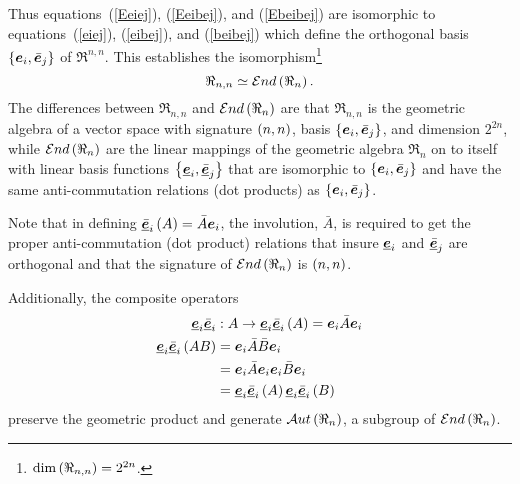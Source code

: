 Thus equations~(\ref{Eeiej}), (\ref{Eeibej}), and (\ref{Ebeibej}) are isomorphic to equations~(\ref{eiej}), (\ref{eibej}), and 
(\ref{beibej}) which define the orthogonal basis $\left \{ {\bm{e}_{i},\bar{\bm{e}}_{j}} \right \}$ of $\Re^{n,n}$.  This establishes the isomorphism\footnote{
${\dim}\left ( {\Re_{n,n}} \right )=2^{2n}$.}
\begin{equation}
	\Re_{n,n} \simeq {\mathcal{E}nd}\left ( {\Re_{n}} \right ).
\end{equation}
The differences between $\Re_{n,n}$ and ${\mathcal{E}nd}\left ( {\Re_{n}} \right )$ are that $\Re_{n,n}$ is the geometric algebra of a vector space with signature
$\left ( {n,n} \right )$, basis $\left \{ {\bm{e}_{i},\bar{\bm{e}}_{j}} \right \}$, and dimension $2^{2n}$, while ${\mathcal{E}nd}\left ( {\Re_{n}} \right )$ are the linear mappings of the 
geometric algebra $\Re_{n}$ on to itself with linear basis functions $\left \{ {\underline{\bm{e}}_{i},\underline{\bar{\bm{e}}}_{j}} \right \}$ that are isomorphic to 
$\left \{ {\bm{e}_{i},\bar{\bm{e}}_{j}} \right \}$ and have the same anti-commutation relations (dot products) as $\left \{ {\bm{e}_{i},\bar{\bm{e}}_{j}} \right \}$.

Note that in defining ${\underline{\bar{\bm{e}}}_{i}}\left ( {A} \right ) = \bar{A}\bm{e}_{i}$, the involution, $\bar{A}$, is required to get the proper 
anti-commutation (dot product) relations that insure $\underline{\bm{e}}_{i}$ and $\underline{\bar{\bm{e}}}_{j}$ are orthogonal and that the 
signature of ${\mathcal{E}nd}\left ( {\Re_{n}} \right )$ is $\left ( {n,n} \right )$.

Additionally, the composite operators
\begin{align}
	\underline{\bm{e}}_{i}\underline{\bar{\bm{e}}}_{i}&:A\rightarrow {\underline{\bm{e}}_{i}\underline{\bar{\bm{e}}}_{i}}\left ( {A} \right ) = \bm{e}_{i}\bar{A}\bm{e}_{i} \\
	{\underline{\bm{e}}_{i}\underline{\bar{\bm{e}}}_{i}}\left ( {AB} \right ) &=  \bm{e}_{i}\bar{A}\bar{B}\bm{e}_{i} \nonumber \\
	                                           &=  \bm{e}_{i}\bar{A}\bm{e}_{i}\bm{e}_{i}\bar{B}\bm{e}_{i} \nonumber \\
	                                           &= {\underline{\bm{e}}_{i}\underline{\bar{\bm{e}}}_{i}}\left ( {A} \right ){\underline{\bm{e}}_{i}\underline{\bar{\bm{e}}}_{i}}\left ( {B} \right )
\end{align}
preserve the geometric product and generate ${\mathcal{A}ut}\left ( {\Re_{n}} \right )$, a subgroup of ${\mathcal{E}nd}\left ( {\Re_{n}} \right )$.



